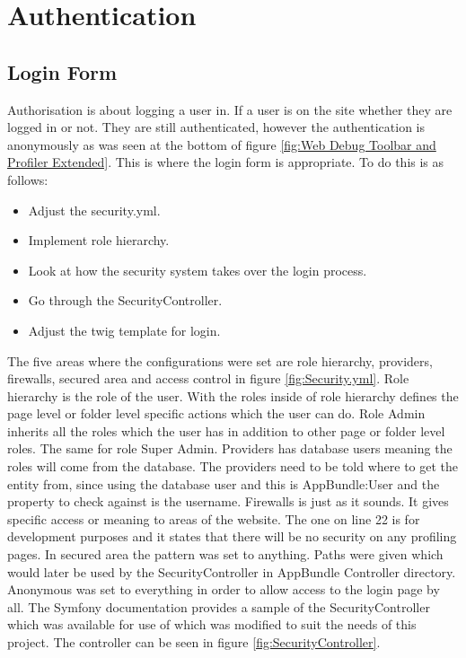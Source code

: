 \section{Authentication}

\subsection{Login Form}

Authorisation is about logging a user in. If a user is on the site whether they are logged in or not. They are still authenticated, however the authentication is anonymously as was seen at the bottom of figure \ref{fig:Web Debug Toolbar and Profiler Extended}. This is where the login form is appropriate. To do this is as follows:

\begin{itemize}
  \item Adjust the security.yml.
    \item Implement role hierarchy.
      \item Look at how the security system takes over the login process.
        \item Go through the SecurityController.
          \item Adjust the twig template for login.
\end{itemize}

The five areas where the configurations were set are role hierarchy, providers, firewalls, secured area and access control in figure \ref{fig:Security.yml}. Role hierarchy is the role of the user. With the roles inside of role hierarchy defines the page level or folder level specific actions which the user can do. Role Admin inherits all the roles which the user has in addition to other page or folder level roles. The same for role Super Admin. Providers has database users meaning the roles will come from the database. The providers need to be told where to get the entity from,  since using the database user and this is AppBundle:User and the property to check against is the username. Firewalls is just as it sounds. It gives specific access or meaning to areas of the website. The one on line 22 is for development purposes and it states that there will be no security on any profiling pages. In secured area the pattern was set to anything. Paths were given which would later be used by the SecurityController in AppBundle Controller directory. Anonymous was set to everything in order to allow access to the login page by all. The Symfony documentation provides a sample of the SecurityController which was available for use of which was modified to suit the needs of this project. The controller can be seen in figure \ref{fig:SecurityController}.

